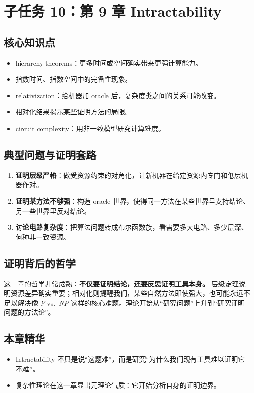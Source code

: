 \section{子任务 10：第 9 章 Intractability}

\subsection{核心知识点}

\begin{itemize}[leftmargin=2em]
  \item hierarchy theorems：更多时间或空间确实带来更强计算能力。
  \item 指数时间、指数空间中的完备性现象。
  \item relativization：给机器加 oracle 后，复杂度类之间的关系可能改变。
  \item 相对化结果揭示某些证明方法的局限。
  \item circuit complexity：用非一致模型研究计算难度。
\end{itemize}

\subsection{典型问题与证明套路}

\begin{enumerate}[leftmargin=2em]
  \item \textbf{证明层级严格}：做受资源约束的对角化，让新机器在给定资源内专门和低层机器作对。
  \item \textbf{证明某方法不够强}：构造 oracle 世界，使得同一方法在某些世界里支持结论、另一些世界里反对结论。
  \item \textbf{讨论电路复杂度}：把算法问题转成布尔函数族，看需要多大电路、多少层深、何种非一致资源。
\end{enumerate}

\subsection{证明背后的哲学}

这一章的哲学非常成熟：\textbf{不仅要证明结论，还要反思证明工具本身。}
层级定理说明资源差异确实重要；相对化则提醒我们，某些自然方法即使强大，也可能永远不足以解决像 $P$ vs.\ $NP$ 这样的核心难题。理论开始从“研究问题”上升到“研究证明问题的方法论”。

\subsection{本章精华}

\begin{itemize}[leftmargin=2em]
  \item Intractability 不只是说“这题难”，而是研究“为什么我们现有工具难以证明它不难”。
  \item 复杂性理论在这一章显出元理论气质：它开始分析自身的证明边界。
\end{itemize}

\newpage
